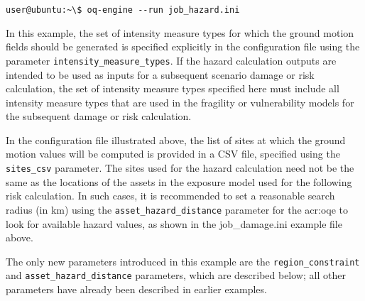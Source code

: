 \begin{verbatim}
user@ubuntu:~\$ oq-engine --run job_hazard.ini
\end{verbatim}

In this example, the set of intensity measure types for which the ground
motion fields should be generated is specified explicitly in the configuration
file using the parameter \Verb+intensity_measure_types+. If the hazard
calculation outputs are intended to be used as inputs for a subsequent
scenario damage or risk calculation, the set of intensity measure types
specified here must include all intensity measure types that are used in the
fragility or vulnerability models for the subsequent damage or risk
calculation.

In the configuration file illustrated above, the list of sites at which the
ground motion values will be computed is provided in a CSV file, specified
using the \Verb+sites_csv+ parameter. The sites used for the hazard
calculation need not be the same as the locations of the assets in the
exposure model used for the following risk calculation. In such cases, it is
recommended to set a reasonable search radius (in km) using the
\Verb+asset_hazard_distance+ parameter for the \glsdesc{acr:oqe} to look for
available hazard values, as shown in the job\_damage.ini example file above.

The only new parameters introduced in this example are the
\Verb+region_constraint+ and \Verb+asset_hazard_distance+ parameters, which
are described below; all other parameters have already been described in
earlier examples.

